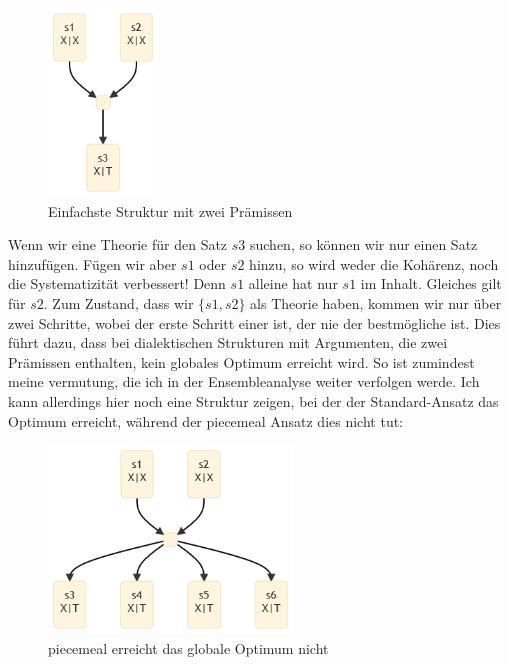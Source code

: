 \documentclass{article}
\begin{document}
\begin{figure}[ht]
  \centering
  \includegraphics[width=\textwidth,height=5cm,keepaspectratio]{images/2prem.png}
  \caption{Einfachste Struktur mit zwei Prämissen\label{fig:2prem}}
\end{figure}

Wenn wir eine Theorie für den Satz $s3$ suchen, so können wir nur einen Satz hinzufügen. Fügen wir aber $s1$ oder $s2$ hinzu, so wird weder die Kohärenz, noch die Systematizität verbessert! Denn $s1$ alleine hat nur $s1$ im Inhalt. Gleiches gilt für $s2$. Zum Zustand, dass wir $\{s1,s2\}$ als Theorie haben, kommen wir nur über zwei Schritte, wobei der erste Schritt einer ist, der nie der bestmögliche ist. Dies führt dazu, dass bei dialektischen Strukturen mit Argumenten, die zwei Prämissen enthalten, kein globales Optimum erreicht wird. So ist zumindest meine vermutung, die ich in der Ensembleanalyse weiter verfolgen werde. Ich kann allerdings hier noch eine Struktur zeigen, bei der der Standard-Ansatz das Optimum erreicht, während der piecemeal Ansatz dies nicht tut:

\begin{figure}[ht]
  \centering
  \includegraphics[width=\textwidth,height=5cm,keepaspectratio]{images/standard_better.png}
  \caption{piecemeal erreicht das globale Optimum nicht\label{fig:standard_better}}
\end{figure}
\end{document}

